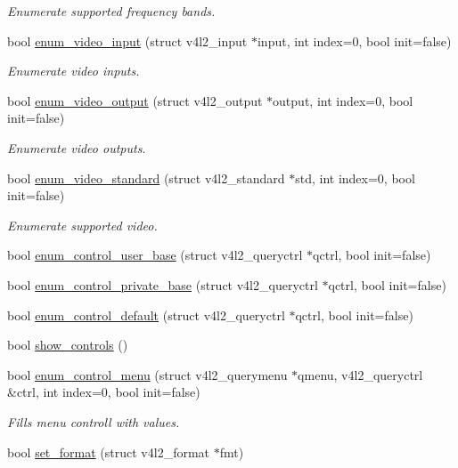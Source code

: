 \begin{DoxyCompactItemize}
\begin{DoxyCompactList}\small\item\em Enumerate supported frequency bands. \end{DoxyCompactList}\item 
bool \hyperlink{classv4lcap_a77a9eda7d80dcf417afd97e6417d900b}{enum\+\_\+video\+\_\+input} (struct v4l2\+\_\+input $\ast$input, int index=0, bool init=false)
\begin{DoxyCompactList}\small\item\em Enumerate video inputs. \end{DoxyCompactList}\item 
bool \hyperlink{classv4lcap_aca4167638528670f624a7e8676aeeb84}{enum\+\_\+video\+\_\+output} (struct v4l2\+\_\+output $\ast$output, int index=0, bool init=false)
\begin{DoxyCompactList}\small\item\em Enumerate video outputs. \end{DoxyCompactList}\item 
bool \hyperlink{classv4lcap_a236476c3f736c1870a63ed79f4c1d5a9}{enum\+\_\+video\+\_\+standard} (struct v4l2\+\_\+standard $\ast$std, int index=0, bool init=false)
\begin{DoxyCompactList}\small\item\em Enumerate supported video. \end{DoxyCompactList}\item 
bool \hyperlink{classv4lcap_a5ebdba4ccfce2572c143e6a291ef17ae}{enum\+\_\+control\+\_\+user\+\_\+base} (struct v4l2\+\_\+queryctrl $\ast$qctrl, bool init=false)
\item 
bool \hyperlink{classv4lcap_a8d3a9ba9c833aca83f339ba1a9965bf0}{enum\+\_\+control\+\_\+private\+\_\+base} (struct v4l2\+\_\+queryctrl $\ast$qctrl, bool init=false)
\item 
bool \hyperlink{classv4lcap_a34897884f1bfc348eea63d49d09417f7}{enum\+\_\+control\+\_\+default} (struct v4l2\+\_\+queryctrl $\ast$qctrl, bool init=false)
\item 
bool \hyperlink{classv4lcap_a240c44f236eac63c0e76c81473170ef9}{show\+\_\+controls} ()
\item 
bool \hyperlink{classv4lcap_a9d192d856a6f4243a4a4508beef2e211}{enum\+\_\+control\+\_\+menu} (struct v4l2\+\_\+querymenu $\ast$qmenu, v4l2\+\_\+queryctrl \&ctrl, int index=0, bool init=false)
\begin{DoxyCompactList}\small\item\em Fills menu controll with values. \end{DoxyCompactList}\item 
bool \hyperlink{classv4lcap_aedf12169721a174af1c2eea5244ff5d7}{set\+\_\+format} (struct v4l2\+\_\+format $\ast$fmt)
\end{DoxyCompactItemize}
